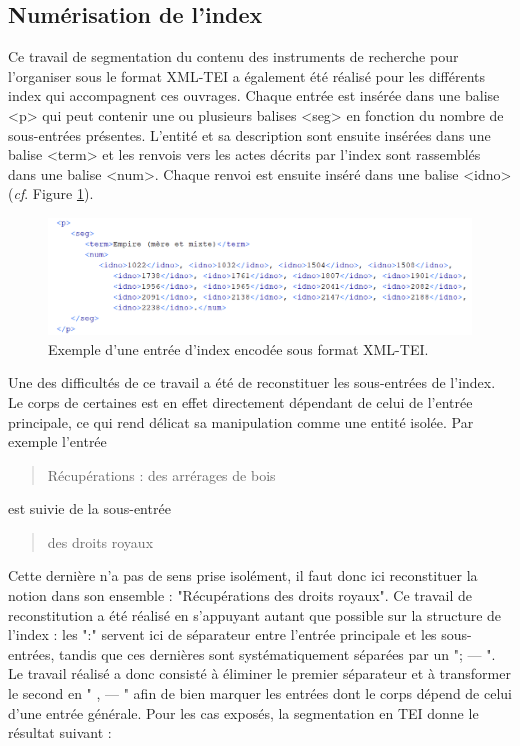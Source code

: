 \documentclass[a4paper,12pt,twoside]{book}
\begin{document}
	\subsection{Numérisation de l’index}

	Ce travail de segmentation du contenu des instruments de recherche pour l'organiser sous le format XML-TEI a également été réalisé pour les différents index qui accompagnent ces ouvrages. Chaque entrée est insérée dans une balise <p> qui peut contenir une ou plusieurs balises <seg> en fonction du nombre de sous-entrées présentes. L'entité et sa description sont ensuite insérées dans une balise <term> et les renvois vers les actes décrits par l'index sont rassemblés dans une balise <num>. Chaque renvoi est ensuite inséré dans une balise <idno> (\textit{cf}. Figure \ref{index_TEI}).
	
	\begin{figure}
		\centering
		\includegraphics[width=\textwidth]{Images/index_en_TEI.png}
		\caption{Exemple d'une entrée d'index encodée sous format XML-TEI.}
		\label{index_TEI}
	\end{figure} 
	
	Une des difficultés de ce travail a été de reconstituer les sous-entrées de l'index. Le corps de certaines est en effet directement dépendant de celui de l'entrée principale, ce qui rend délicat sa manipulation comme une entité isolée. Par exemple l'entrée
	
	\begin{quotation}
		Récupérations : des arrérages de bois
	\end{quotation}

	\noindent est suivie de la sous-entrée
	
	\begin{quotation}
		des droits royaux
	\end{quotation}

	\noindent Cette dernière n'a pas de sens prise isolément, il faut donc ici reconstituer la notion dans son ensemble : "Récupérations des droits royaux". Ce travail de reconstitution a été réalisé en s'appuyant autant que possible sur la structure de l'index : les ":" servent ici de séparateur entre l'entrée principale et les sous-entrées, tandis que ces dernières sont systématiquement séparées par un "; — ". Le travail réalisé a donc consisté à éliminer le premier séparateur et à transformer le second en " , — " afin de bien marquer les entrées dont le corps dépend de celui d'une entrée générale. Pour les cas exposés, la segmentation en TEI donne le résultat suivant :
	
\end{document}
